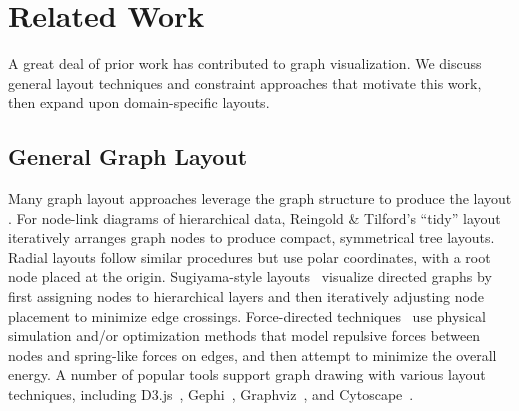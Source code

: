 \section{Related Work}

A great deal of prior work has contributed to graph visualization.
We discuss general layout techniques and constraint approaches
that motivate this work, then expand upon domain-specific layouts.

\subsection{General Graph Layout}
Many graph layout approaches leverage the graph structure to produce the 
layout \cite{herman2000graph,eades2010graph,gibson2013survey}.
For node-link diagrams of hierarchical data, Reingold \& Tilford's ``tidy'' 
layout~\cite{reingold1981tidier} iteratively arranges graph nodes to
produce compact, symmetrical tree layouts.
Radial layouts \cite{battista1998graph,herman2000graph} follow similar procedures but use polar 
coordinates, with a root node placed at the origin.
Sugiyama-style layouts~\cite{sugiyama1981methods} visualize directed graphs by first assigning nodes to hierarchical layers and then iteratively adjusting node placement to minimize edge crossings.
Force-directed techniques~\cite{tutte1963draw,kobourov2012spring,quinn1979forced,fruchterman1991graph} 
use physical simulation and/or optimization methods that model repulsive forces between nodes and spring-like forces on edges, and then attempt to minimize the overall energy. 
A number of popular tools support graph drawing with various layout 
techniques, including D3.js~\cite{bostock:d3}, Gephi~\cite{bastian2009gephi},
Graphviz~\cite{ellson2001graphviz}, and Cytoscape~\cite{shannon2003cytoscape}.

